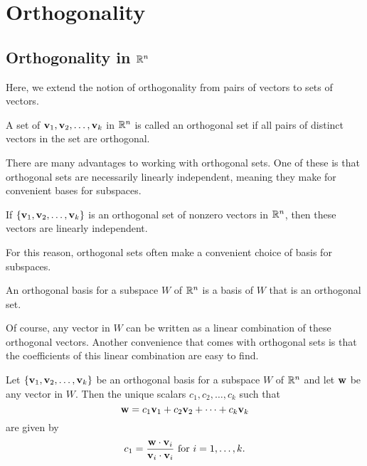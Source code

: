 \documentclass[../m073main.tex]{subfiles}
\begin{document}
\chapter{Orthogonality}
\section{Orthogonality in $\mathbb{R}^n$}
Here, we extend the notion of orthogonality from pairs of vectors to sets of vectors.

\begin{definition}
	A set of $\mathbf{v}_1, \mathbf{v}_2, \ldots, \mathbf{v}_k$ in $\mathbb{R}^n$ is called an orthogonal set if all pairs of distinct vectors in the set are orthogonal. 
\end{definition}

There are many advantages to working with orthogonal sets.
One of these is that orthogonal sets are necessarily linearly independent, meaning they make for convenient bases for subspaces.

\begin{theorem}
	If $\{\mathbf{v}_1, \mathbf{v}_2, \ldots, \mathbf{v}_k\}$ is an orthogonal set of nonzero vectors in $\mathbb{R}^n$, then these vectors are linearly independent.
\end{theorem}

For this reason, orthogonal sets often make a convenient choice of basis for subspaces.

\begin{definition}
	An orthogonal basis for a subspace $W$ of $\mathbb{R}^n$ is a basis of $W$ that is an orthogonal set.
\end{definition}

Of course, any vector in $W$ can be written as a linear combination of these orthogonal vectors.
Another convenience that comes with orthogonal sets is that the coefficients of this linear combination are easy to find.

\begin{theorem}
	Let $\{\mathbf{v}_1, \mathbf{v}_2, \ldots, \mathbf{v}_k\}$ be an orthogonal basis for a subspace $W$ of $\mathbb{R}^n$ and let $\mathbf{w}$ be any vector in $W$.
	Then the unique scalars $c_1, c_2, \ldots, c_k$ such that
	\[ \mathbf{w} = c_1 \mathbf{v}_1 + c_2 \mathbf{v}_2 + \cdots + c_k \mathbf{v}_k \]
	are given by
	\[ c_1 = \frac{\mathbf{w} \cdot \mathbf{v}_i}{\mathbf{v}_i \cdot \mathbf{v}_i} \text{ for } i = 1, \ldots, k. \]
\end{theorem}
\end{document}
